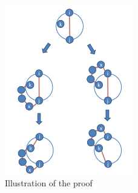 \begin{enumerate}
\begin{figure}[ht]
\includegraphics[width=0.5\textwidth]{q12}%
\caption{Illustration of the proof}%
\label{fig:q12}%
\end{figure}
\clearpage
\end{enumerate}